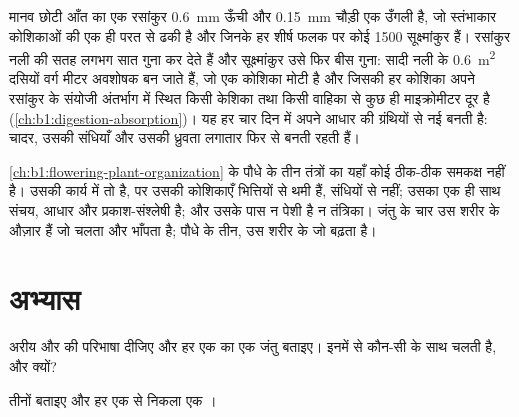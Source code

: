 \begin{example}[विनिमय सतह के रूप में रसांकुर]\label{ex:b1:body-plans-tissues:villus}
मानव छोटी आँत का एक रसांकुर \qty{0.6}{mm} ऊँची और \qty{0.15}{mm} चौड़ी
एक उँगली है, जो स्तंभाकार कोशिकाओं की एक ही परत से ढकी है और जिनके हर
शीर्ष फलक पर कोई \qty{1500}{} सूक्ष्मांकुर हैं। रसांकुर नली की सतह लगभग
सात गुना कर देते हैं और सूक्ष्मांकुर उसे फिर बीस गुना: सादी नली के
\qty{0.6}{m^2} दसियों वर्ग मीटर अवशोषक  बन जाते हैं, जो एक कोशिका
मोटी है और जिसकी हर कोशिका अपने रसांकुर के संयोजी अंतर्भाग में स्थित
किसी केशिका तथा किसी  वाहिका से कुछ ही माइक्रोमीटर दूर है
(\cref{ch:b1:digestion-absorption})। यह  हर चार दिन में अपने आधार की
ग्रंथियों से नई बनती है: चादर, उसकी संधियाँ और उसकी ध्रुवता लगातार फिर
से बनती रहती हैं।
\end{example}

\begin{remark}\label{rem:b1:body-plans-tissues:plants}
\cref{ch:b1:flowering-plant-organization} के पौधे के तीन  तंत्रों का
यहाँ कोई ठीक-ठीक समकक्ष नहीं है। उसकी  कार्य में तो  है, पर
उसकी कोशिकाएँ भित्तियों से थमी हैं, संधियों से नहीं; उसका  एक ही
साथ संचय, आधार और प्रकाश-संश्लेषी है; और उसके पास न पेशी है न तंत्रिका।
जंतु के चार  उस शरीर के औज़ार हैं जो चलता और भाँपता है; पौधे के तीन,
उस शरीर के जो बढ़ता है।
\end{remark}

\section{अभ्यास}

\begin{exercise}[$\star$]\label{exo:b1:body-plans-tissues:1}
अरीय और  की परिभाषा दीजिए और हर एक का एक जंतु बताइए।
इनमें से कौन-सी  के साथ चलती है, और क्यों?
\end{exercise}

\begin{exercise}[$\star$]\label{exo:b1:body-plans-tissues:2}
तीनों  बताइए और हर एक से निकला एक ।
\end{exercise}

